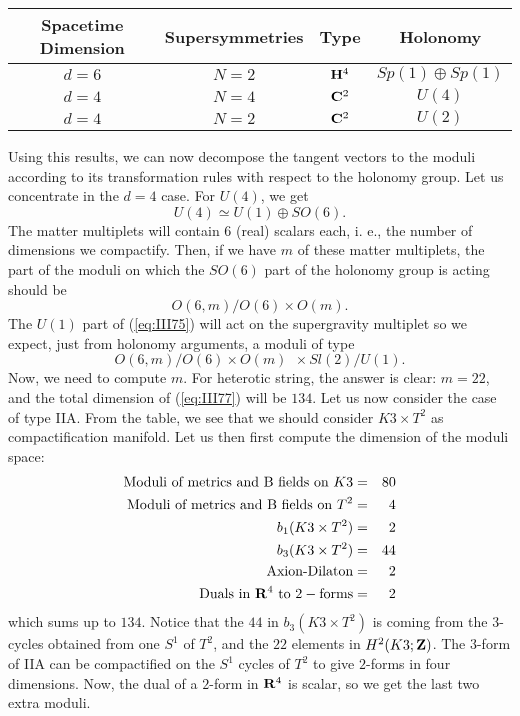 \begin{center}

\begin{tabular}{|c|c|c|c|}     \hline\hline
	 {\bf Spacetime Dimension} & {\bf Supersymmetries} & {\bf Type}    & {\bf Holonomy}  \\ \hline
	 $d=6$                     & $N\!=\!2$             & ${\bf H}^{4}$ & $Sp(1)\oplus Sp(1)$  \\
	 $d=4$                     & $N\!=\!4$             & ${\bf C}^{2}$ & $U(4)$  \\
	 $d=4$                     & $N\!=\!2$             & ${\bf C}^{2}$ & $U(2)$  \\ \hline\hline

\end{tabular}
\label{tab:*}
\end{center}

Using this results, we can now decompose the tangent vectors
to the moduli according to its transformation rules with respect
to the holonomy group. Let us concentrate in the $d=4$ case. For
$U(4)$, we get
\begin{equation}
U(4) \simeq U(1) \oplus SO(6).
\label{eq:III75}
\end{equation}
The matter multiplets will contain $6$ (real) scalars each, i. e., the
number of dimensions we compactify. Then, if we have $m$ of these
matter multiplets, the part of the moduli on which the $SO(6)$
part of the holonomy group is acting should be
\begin{equation}
O(6,m) / O(6) \times O(m).
\label{eq:III76}
\end{equation}
The $U(1)$ part of (\ref{eq:III75}) will act on the supergravity
multiplet so we expect, just from holonomy arguments, a moduli of
type
\begin{equation}
O(6,m) / O(6) \times O(m) \: \: \times Sl(2)/U(1).
\label{eq:III77}
\end{equation}
Now, we need to compute $m$. For heterotic string, the answer is
clear: $m=22$, and the total dimension of (\ref{eq:III77}) will
be $134$. Let us now consider the case of type IIA. From the table, 
we see that we should consider $K3\times T^2$ as
compactification manifold. Let us then first compute the
dimension of the moduli space:
\begin{eqnarray}
\hbox {Moduli of metrics and B fields on }K3  & = & 80 \nonumber \\
\hbox {Moduli of metrics and B fields on }T^2 & = & 4 \nonumber \\
b_1(K3\times T^2) & = & 2 \nonumber \\
b_3(K3\times T^2) & = & 44 \nonumber \\
\hbox {Axion-Dilaton} & = & 2 \nonumber \\ 
\hbox {Duals in }{\bf R}^4\hbox { to }2-\hbox {forms} & = & 2
\label{eq:III78}
\end{eqnarray}
which sums up to $134$. Notice that the $44$ in $b_3(K3\times
T^2)$ is coming from the $3$-cycles obtained from one $S^1$ of
$T^2$, and the $22$ elements in $H^2(K3;{\bf Z})$. The $3$-form
of IIA can be compactified on the $S^1$ cycles of $T^2$ to give
$2$-forms in four dimensions. Now, the dual of a $2$-form in
${\bf R}^4$ is scalar, so we get the last two extra moduli.
  
